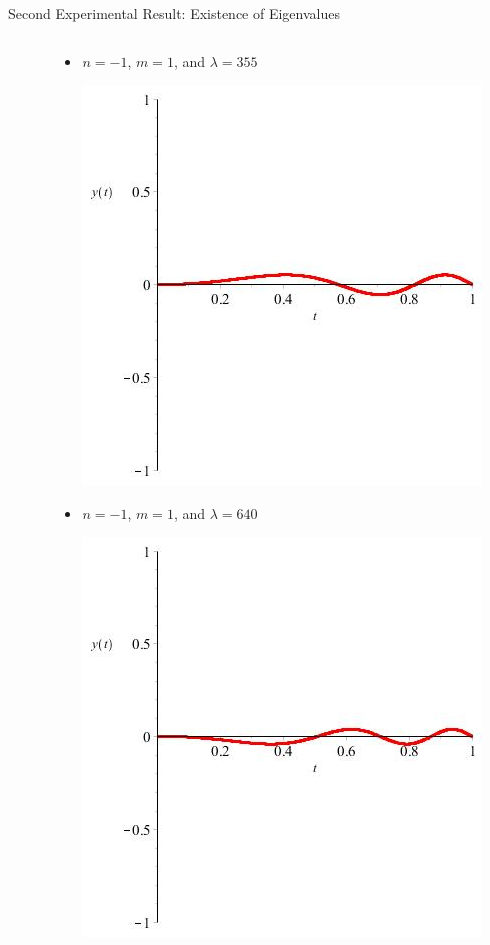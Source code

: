 \documentclass{beamer}
\begin{document}
\begin{frame}{Second Experimental Result: Existence of Eigenvalues}
\begin{columns}[T]
\begin{column}{35mm}
\begin{itemize}
\end{itemize}

\end{column}

\hspace*{-3mm}

\begin{column}{35mm}

\begin{itemize}

\item $n=-1$, $m=1$, and $\lambda=355$

\includegraphics[scale=0.2]{NEqualsNegative1MEquals1LambdaEquals355}

\item $n=-1$, $m=1$, and $\lambda=640$

\includegraphics[scale=0.2]{NEqualsNegative1MEquals1LambdaEquals640}


\end{itemize}
\end{column}
\end{columns}
\end{frame}
\end{document}
